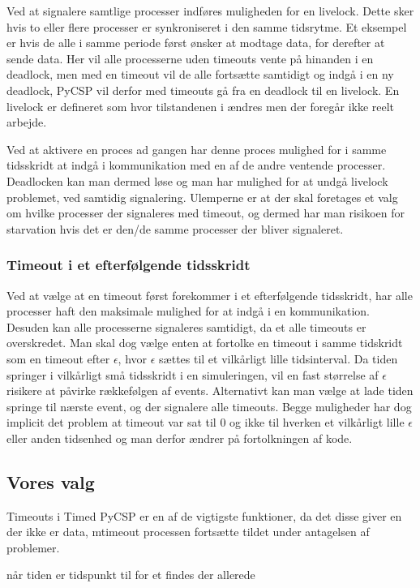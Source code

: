 Ved at signalere samtlige processer indføres muligheden for en livelock. Dette
sker hvis to eller flere processer er  synkroniseret i den samme tidsrytme.
Et eksempel er hvis de alle i samme periode først ønsker at modtage data, for 
derefter at sende data. Her vil alle processerne uden timeouts vente på 
hinanden i en deadlock, men med en timeout vil de alle fortsætte samtidigt og 
indgå i en ny deadlock, PyCSP vil derfor med timeouts gå fra en deadlock til 
en livelock. En livelock er defineret som hvor tilstandenen i ændres men der
foregår ikke reelt arbejde. 

Ved at aktivere en proces ad gangen har denne proces mulighed for i samme 
tidsskridt at indgå i kommunikation med en af de andre ventende processer. 
Deadlocken kan man dermed løse og man har mulighed for at undgå livelock 
problemet, ved samtidig signalering.
Ulemperne er at der skal foretages et valg om hvilke processer der signaleres 
med  timeout, og dermed har man risikoen for starvation hvis det 
er den/de samme processer der bliver signaleret.

\subsubsection{Timeout i et efterfølgende tidsskridt}
Ved at vælge at en timeout først forekommer i et efterfølgende tidsskridt, har 
alle processer haft den maksimale mulighed for at indgå i en kommunikation. 
Desuden kan alle processerne signaleres samtidigt, da et alle  timeouts er 
overskredet. Man skal dog vælge enten at fortolke en timeout i samme tidskridt  
som en timeout efter $\epsilon$, hvor $\epsilon$ sættes til et vilkårligt 
lille tidsinterval. Da tiden springer i vilkårligt små tidsskridt i  en 
simuleringen, vil en fast størrelse af $\epsilon$ risikere at påvirke 
rækkefølgen af events. Alternativt kan man vælge at lade tiden springe til 
nærste event, og der signalere alle timeouts. Begge muligheder har dog 
implicit det problem at timeout var sat til 0 og ikke til hverken et 
vilkårligt lille $\epsilon$ eller anden tidsenhed og man derfor ændrer på 
fortolkningen af kode.

\subsection{Vores valg} 

Timeouts i Timed PyCSP er en af de vigtigste funktioner, da det disse giver en
der ikke er data, mtimeout processen fortsætte  tildet under antagelsen af 
problemer.

når tiden er  tidspunkt
til for et findes der allerede  
